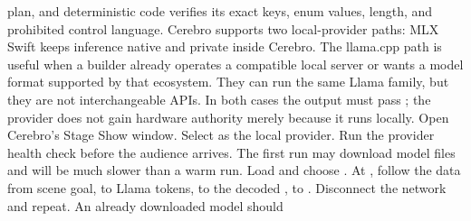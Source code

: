 {}plan, and deterministic code verifies its exact keys, enum values, length, and\markdownRendererSoftLineBreak
{}prohibited control language.\markdownRendererInterblockSeparator
{}
\markdownRendererSectionEnd \markdownRendererSectionBegin
{}\markdownRendererInterblockSeparator
{}Cerebro supports two local-provider paths:\markdownRendererInterblockSeparator
{}\markdownRendererInterblockSeparator
{}MLX Swift keeps inference native and private inside Cerebro. The llama.cpp\markdownRendererSoftLineBreak
{}path is useful when a builder already operates a compatible local server or\markdownRendererSoftLineBreak
{}wants a model format supported by that ecosystem. They can run the same Llama\markdownRendererSoftLineBreak
{}family, but they are not interchangeable APIs. In both cases the output must\markdownRendererSoftLineBreak
{}pass ; the provider does not gain hardware\markdownRendererSoftLineBreak
{}authority merely because it runs locally.\markdownRendererInterblockSeparator
{}
\markdownRendererSectionEnd \markdownRendererSectionBegin
{}\markdownRendererInterblockSeparator
{}\markdownRendererOlBegin
{}Open Cerebro's Stage Show window.\markdownRendererOlItemEnd 
{}Select  as the local provider.\markdownRendererOlItemEnd 
{}Run the provider health check before the audience arrives. The first run\markdownRendererSoftLineBreak
{}may download model files and will be much slower than a warm run.\markdownRendererOlItemEnd 
{}Load  and choose .\markdownRendererOlItemEnd 
{}At , follow the data from scene goal, to Llama tokens, to the\markdownRendererSoftLineBreak
{}decoded , to .\markdownRendererOlItemEnd 
{}Disconnect the network and repeat. An already downloaded model should\markdownRendererSoftLineBreak
